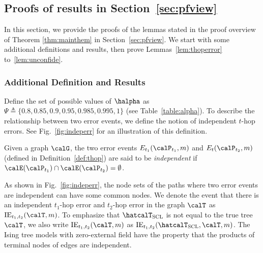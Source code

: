 \documentclass[11pt,onecolumn]{article}
\begin{document}
\subsection{Proofs of results in Section~\ref{sec:pfview}}
In this section, we provide the proofs of the lemmas stated in the proof overview of Theorem \ref{thm:mainthem} in Section~\ref{sec:pfview}. We start with some additional definitions and results, then prove Lemmas~\ref{lem:thoperror} to~\ref{lem:unconfide}. 
\subsubsection{Additional Definition and Results}
  Define the set of possible values of $\halpha$ as  $\Psi\triangleq\{0.8,0.85,0.9,0.95,0.985,0.995,1\}$ (see Table~\ref{table:alpha}). To describe the relationship between two error events, we define the notion of independent $t$-hop errors. See Fig.~\ref{fig:indeperr} for an illustration of this definition.
\begin{definition}
	Given a graph $\calG$, the two error events $E_{t_{1}}(\calP_{t_{1}},m)$ and $E_{t}(\calP_{t_{2}},m)$ (defined in Definition~\ref{def:thop}) are said to be {\em independent}  if $\calE (\calP_{t_{1}} )\cap\calE (\calP_{t_{2}} )= \emptyset$. 
\end{definition}
As shown in Fig.~\ref{fig:indeperr}, the node sets of the paths where two error events are independent can have some common nodes. We denote the event that there is an independent $t_{1}$-hop error and $t_{2}$-hop error in the graph $\calT$ as $\mathrm{IE}_{t_{1},t_{2}}(\calT,m)$. To emphasize that $\hatcalT_{{\rm SCL}}$ is not equal to the true tree $\calT$, we also write $\mathrm{IE}_{t_{1},t_{2}}(\calT,m)$ as $\mathrm{IE}_{t_{1},t_{2}}(\hatcalT_{{\rm SCL}},\calT,m)$.
The Ising tree models with zero-external field have the property that the products of terminal nodes of edges are independent\cite{nikolakakis2021predictive}.
\end{document}
